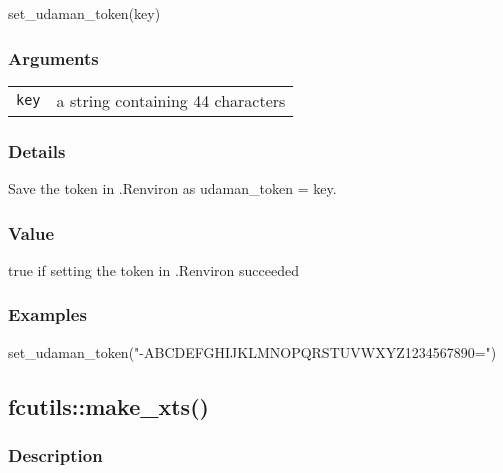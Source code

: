 \documentclass[
  letterpaper,
  DIV=11,
  numbers=noendperiod]{scrreport}
\newenvironment{Shaded}{\begin{snugshade}}{\end{snugshade}}
\newcommand{\FunctionTok}[1]{\textcolor[rgb]{0.28,0.35,0.67}{#1}}
\newcommand{\NormalTok}[1]{\textcolor[rgb]{0.00,0.23,0.31}{#1}}
\newcommand{\StringTok}[1]{\textcolor[rgb]{0.13,0.47,0.30}{#1}}
\begin{document}
\begin{Shaded}
\begin{Highlighting}[]
\FunctionTok{set\_udaman\_token}\NormalTok{(key)}
\end{Highlighting}
\end{Shaded}

\subsubsection{Arguments}\label{arguments-2}

\begin{longtable}[]{@{}ll@{}}
\toprule\noalign{}
\endhead
\bottomrule\noalign{}
\endlastfoot
\texttt{key} & a string containing 44 characters \\
\end{longtable}

\subsubsection{Details}\label{details-2}

Save the token in .Renviron as udaman\_token = key.

\subsubsection{Value}\label{value-2}

true if setting the token in .Renviron succeeded

\subsubsection{Examples}\label{examples-2}

\begin{Shaded}
\begin{Highlighting}[]
\FunctionTok{set\_udaman\_token}\NormalTok{(}\StringTok{"{-}ABCDEFGHIJKLMNOPQRSTUVWXYZ1234567890="}\NormalTok{)}
\end{Highlighting}
\end{Shaded}

\subsection{fcutils::make\_xts()}\label{fcutilsmake_xts}

\subsubsection{Description}\label{description-3}
\end{document}

